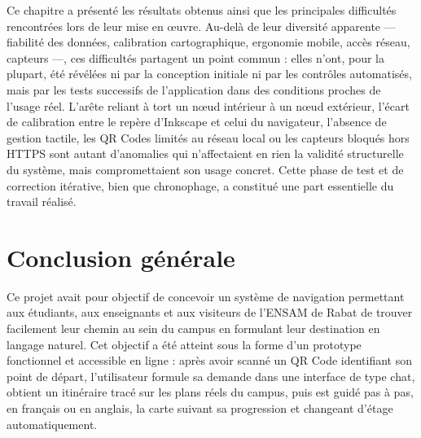 \documentclass[12pt,a4paper]{report}
\begin{document}
\medskip
Ce chapitre a présenté les résultats obtenus ainsi que les principales difficultés rencontrées lors
de leur mise en œuvre. Au-delà de leur diversité apparente — fiabilité des données, calibration
cartographique, ergonomie mobile, accès réseau, capteurs —, ces difficultés partagent un point
commun : elles n'ont, pour la plupart, été révélées ni par la conception initiale ni par les
contrôles automatisés, mais par les tests successifs de l'application dans des conditions proches
de l'usage réel. L'arête reliant à tort un nœud intérieur à un nœud extérieur, l'écart de
calibration entre le repère d'Inkscape et celui du navigateur, l'absence de gestion tactile, les QR
Codes limités au réseau local ou les capteurs bloqués hors HTTPS sont autant d'anomalies qui
n'affectaient en rien la validité structurelle du système, mais compromettaient son usage concret.
Cette phase de test et de correction itérative, bien que chronophage, a constitué une part
essentielle du travail réalisé.

\chapter*{Conclusion générale}

Ce projet avait pour objectif de concevoir un système de navigation permettant aux étudiants, aux
enseignants et aux visiteurs de l'ENSAM de Rabat de trouver facilement leur chemin au sein du
campus en formulant leur destination en langage naturel. Cet objectif a été atteint sous la forme
d'un prototype fonctionnel et accessible en ligne : après avoir scanné un QR Code identifiant son
point de départ, l'utilisateur formule sa demande dans une interface de type chat, obtient un
itinéraire tracé sur les plans réels du campus, puis est guidé pas à pas, en français ou en anglais,
la carte suivant sa progression et changeant d'étage automatiquement.
\end{document}
